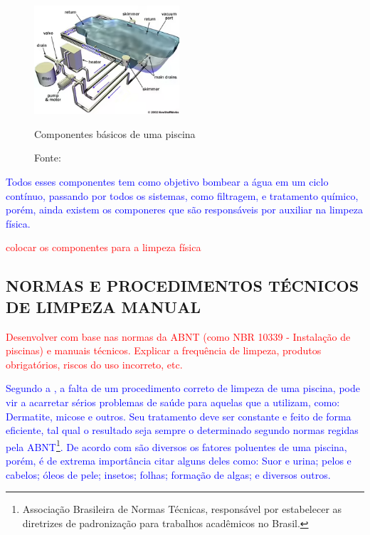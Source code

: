         \begin{figure}[H]
         	\centering
         	\caption{ }  
        	\centering
         	\label{fig:cont}
        	\includegraphics[width=0.48\textwidth]{imagens/componentesPiscina.png}
            \caption*{Componentes básicos de uma piscina}
        	\caption*{Fonte: \cite{refComponents}}
         \end{figure}

        \textcolor{blue}{Todos esses componentes tem como objetivo bombear a água em um ciclo contínuo, passando por todos os sistemas, como filtragem, e tratamento químico, porém, ainda existem os componeres que são responsáveis por auxiliar na limpeza física.}

         \textcolor{red}{colocar os componentes para a limpeza física}
        

    \subsection{NORMAS E PROCEDIMENTOS TÉCNICOS DE LIMPEZA MANUAL}

       \textcolor{red}{Desenvolver com base nas normas da ABNT (como NBR 10339 - Instalação de piscinas) e manuais técnicos. Explicar a frequência de limpeza, produtos obrigatórios, riscos do uso incorreto, etc.}

       \textcolor{blue}{Segundo a \cite{piscineiroProfissional}, a falta de um procedimento correto de limpeza de uma piscina, pode vir a acarretar sérios problemas de saúde para aquelas que a utilizam, como: Dermatite, micose e outros. Seu tratamento deve ser constante e feito de forma eficiente, tal qual o resultado seja sempre o determinado segundo normas regidas pela ABNT\footnote{Associação Brasileira de Normas Técnicas, responsável por estabelecer as diretrizes de padronização para trabalhos acadêmicos no Brasil.}. De acordo com \cite{guiaTratamento} são diversos os fatores poluentes de uma piscina, porém, é de extrema importância citar alguns deles como: Suor e urina; pelos e cabelos; óleos de pele; insetos; folhas; formação de algas; e diversos outros.}

